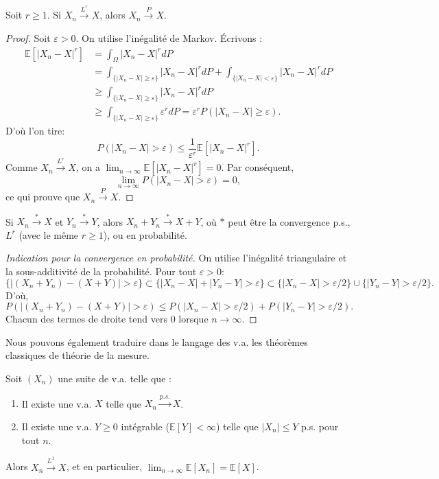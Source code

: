 \begin{proposition}
Soit $r \geq 1$. Si $X_n \xrightarrow{L^r} X$, alors $X_n \xrightarrow{P} X$.
\end{proposition}
\begin{proof}
Soit $\varepsilon > 0$. On utilise l'inégalité de Markov. Écrivons :
\begin{align*}
    \mathbb{E}[|X_n - X|^r] &= \int_{\Omega} |X_n - X|^r dP \\
    &= \int_{\{|X_n - X| \geq \varepsilon\}} |X_n - X|^r dP + \int_{\{|X_n - X| < \varepsilon\}} |X_n - X|^r dP \\
    &\geq \int_{\{|X_n - X| \geq \varepsilon\}} |X_n - X|^r dP \\
    &\geq \int_{\{|X_n - X| \geq \varepsilon\}} \varepsilon^r dP = \varepsilon^r P(|X_n - X| \geq \varepsilon).
\end{align*}
D'où l'on tire:
\[
P(|X_n - X| > \varepsilon) \leq \frac{1}{\varepsilon^r} \mathbb{E}[|X_n - X|^r].
\]
Comme $X_n \xrightarrow{L^r} X$, on a $\lim_{n \to \infty} \mathbb{E}[|X_n - X|^r] = 0$. Par conséquent,
\[
\lim_{n \to \infty} P(|X_n - X| > \varepsilon) = 0,
\]
ce qui prouve que $X_n \xrightarrow{P} X$.
\end{proof}
\begin{proposition}
Si $X_n \xrightarrow{*} X$ et $Y_n \xrightarrow{*} Y$, alors $X_n + Y_n \xrightarrow{*} X+Y$, où $*$ peut être la convergence p.s., $L^r$ (avec le même $r \ge 1$), ou en probabilité.
\end{proposition}
\begin{proof}[Indication pour la convergence en probabilité]
On utilise l'inégalité triangulaire et la sous-additivité de la probabilité. Pour tout $\varepsilon > 0$:
\[
\{|(X_n+Y_n) - (X+Y)| > \varepsilon\} \subset \{|X_n-X| + |Y_n-Y| > \varepsilon\} \subset \{|X_n-X| > \varepsilon/2\} \cup \{|Y_n-Y| > \varepsilon/2\}.
\]
D'où,
\[
P(|(X_n+Y_n) - (X+Y)| > \varepsilon) \leq P(|X_n-X| > \varepsilon/2) + P(|Y_n-Y| > \varepsilon/2).
\]
Chacun des termes de droite tend vers 0 lorsque $n \to \infty$.
\end{proof}
Nous pouvons également traduire dans le langage des v.a. les théorèmes classiques de théorie de la mesure.
\begin{example}
Soit $(X_n)$ une suite de v.a. telle que :
\begin{enumerate}
    \item Il existe une v.a. $X$ telle que $X_n \xrightarrow{p.s.} X$.
    \item Il existe une v.a. $Y \geq 0$ intégrable ($\mathbb{E}[Y] < \infty$) telle que $|X_n| \leq Y$ p.s. pour tout $n$.
\end{enumerate}
Alors $X_n \xrightarrow{L^1} X$, et en particulier, $\lim_{n \to \infty} \mathbb{E}[X_n] = \mathbb{E}[X]$.
\end{example}
